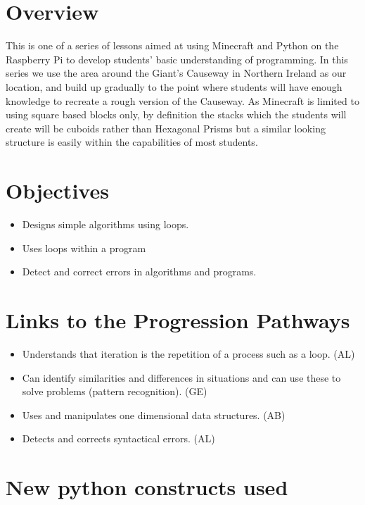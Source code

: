 \documentclass{geocraft-lesson-plan}
\begin{document}
\subtitle{Part 2 - Iteration}

\section*{Overview} This is one of a series of lessons aimed at using Minecraft and Python on the Raspberry Pi to
develop students' basic understanding of programming. In this series we use the area around the Giant's Causeway in
Northern Ireland as our location, and build up gradually to the point where students will have enough knowledge to
recreate a rough version of the Causeway. As Minecraft is limited to using square based blocks only, by definition the
stacks which the students will create will be cuboids rather than Hexagonal Prisms but a similar looking structure is
easily within the capabilities of most students.

\section*{Objectives}
\begin{itemize}
\item Designs simple algorithms using loops.
\item Uses loops within a program
\item Detect and correct errors in algorithms and programs.
\end{itemize}

\section*{Links to the Progression Pathways}

\begin{itemize}
\item Understands that iteration is the repetition of a process such as a loop. (AL)
\item Can identify similarities and differences in situations and can use these to solve problems (pattern
  recognition). (GE) 
\item Uses and manipulates one dimensional data structures. (AB)
\item Detects and corrects syntactical errors. (AL)
\end{itemize}

\section*{New python constructs used}
\end{document}
